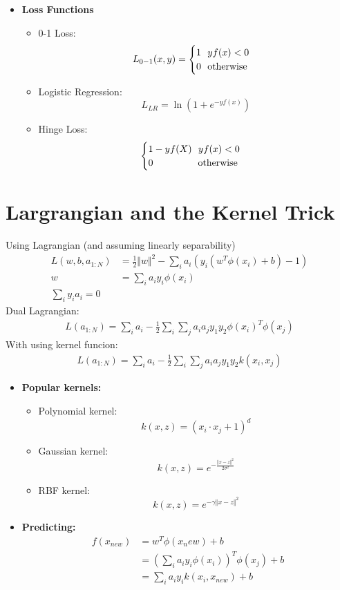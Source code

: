 \documentclass[]{article}
\newcommand{\T}{^T}
\begin{document}
\begin{itemize}
\item \textbf{Loss Functions}
\begin{itemize}
\item 0-1 Loss:\\
\begin{equation*}
L_{0-1} (x, y) = 
\begin{cases}
1 \ \ yf(x) < 0\\
0 \ \ \textup{otherwise}
\end{cases}
\end{equation*}
\item Logistic Regression:
\begin{equation}
L_{LR} = \ln(1 + e^{-yf(x)})
\end{equation}

\item Hinge Loss:
\[ \begin{cases}
	1-yf(X) \ \ yf(x) < 0\\
	0 \ \ \ \ \ \ \ \ \ \ \ \ \ \ \textup{otherwise}
\end{cases} \]
\end{itemize}
\end{itemize}
\section{Largrangian and the Kernel Trick}
Using Lagrangian (and assuming linearly separability) 
\begin{align*}
L(w, b, a_{1:N}) &= \frac{1}{2}\Vert w\Vert ^2 - \sum_i a_i(y_i(w\T\phi(x_i) + b) - 1)\\
w &= \sum_i a_iy_i\phi(x_i) \\
\sum_iy_ia_i = 0
\end{align*}
Dual Lagrangian:
\begin{align*}
	L(a_{1:N}) = \sum_ia_i - \frac{1}{2} \sum_i\sum_j a_ia_jy_1y_2 \phi(x_i)\T\phi(x_j)
\end{align*}
With using kernel funcion:
\begin{align*}
L(a_{1:N}) = \sum_ia_i - \frac{1}{2} \sum_i\sum_j a_ia_jy_1y_2 k(x_i, x_j)
\end{align*}
\begin{itemize}
\item \textbf{Popular kernels:}
\begin{itemize}
\item Polynomial kernel: \[ k(x, z) =(x_i \cdot x_j + 1)^d\]
\item Gaussian kernel:
\[ k(x, z) =e^{-\frac{\Vert x-z\Vert^2}{2\sigma^2}}\]
\item RBF kernel:
\[ k(x, z) =e^{-\gamma \Vert x-z\Vert^2}\]
\end{itemize}
\item \textbf{Predicting:}
\begin{align*}
f(x_{new}) &= w\T\phi(x_new) + b\\
&= \left(\sum_ia_iy_i\phi(x_i)\right)\T\phi(x_j) + b\\
&= \sum_ia_iy_ik(x_i, x_{new}) + b
\end{align*}
\end{itemize}
\end{document}
